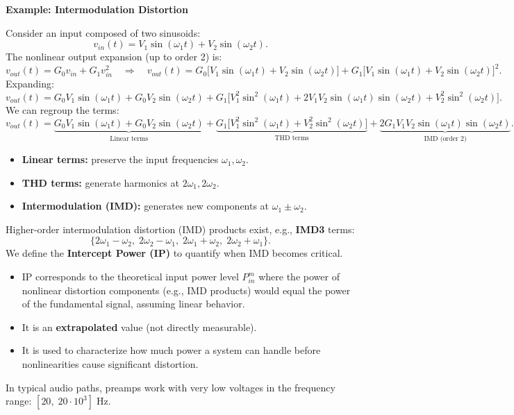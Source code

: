 \textbf{Example: Intermodulation Distortion}

Consider an input composed of two sinusoids:
\[
    v_{in}(t) = V_1 \sin(\omega_1 t) + V_2 \sin(\omega_2 t).
\]
The nonlinear output expansion (up to order 2) is:
\[
    v_{out}(t) = G_0 v_{in} + G_1 v_{in}^2
    \quad \Rightarrow \quad
    v_{out}(t) = G_0 \Big[ V_1 \sin(\omega_1 t) + V_2 \sin(\omega_2 t) \Big] 
    + G_1 \Big[ V_1 \sin(\omega_1 t) + V_2 \sin(\omega_2 t) \Big]^2.
\]
Expanding:
\[
    v_{out}(t) = G_0 V_1 \sin(\omega_1 t) + G_0 V_2 \sin(\omega_2 t) 
    + G_1 \Big[ V_1^2 \sin^2(\omega_1 t) + 2 V_1 V_2 \sin(\omega_1 t)\sin(\omega_2 t) + V_2^2 \sin^2(\omega_2 t) \Big].
\]
We can regroup the terms:
\[
    v_{out}(t) = 
    \underbrace{G_0 V_1 \sin(\omega_1 t) + G_0 V_2 \sin(\omega_2 t)}_{\text{Linear terms}}
    + \underbrace{G_1 \big[ V_1^2 \sin^2(\omega_1 t) + V_2^2 \sin^2(\omega_2 t) \big]}_{\text{THD terms}}
    + \underbrace{2 G_1 V_1 V_2 \sin(\omega_1 t)\sin(\omega_2 t)}_{\text{IMD (order 2)}}.
\]

\begin{itemize}
    \item \textbf{Linear terms:} preserve the input frequencies $\omega_1, \omega_2$.  
    \item \textbf{THD terms:} generate harmonics at $2\omega_1, 2\omega_2$.  
    \item \textbf{Intermodulation (IMD):} generates new components at $\omega_1 \pm \omega_2$.  
\end{itemize}

Higher-order intermodulation distortion (IMD) products exist, e.g., \textbf{IMD3} terms:
\[
    \{2\omega_1 - \omega_2, \; 2\omega_2 - \omega_1, \; 2\omega_1 + \omega_2, \; 2\omega_2 + \omega_1 \}.
\]
We define the \textbf{Intercept Power (IP)} to quantify when IMD becomes critical.  
\begin{itemize}
    \item IP corresponds to the theoretical input power level $P_{in}^m$ where the power of nonlinear distortion components (e.g., IMD products) would equal the power of the fundamental signal, assuming linear behavior.  
    \item It is an \textbf{extrapolated} value (not directly measurable).  
    \item It is used to characterize how much power a system can handle before nonlinearities cause significant distortion.  
\end{itemize}

 In typical audio paths, preamps work with very low voltages in the frequency range: $[20, \; 20 \cdot 10^3] \; \text{Hz}$.

